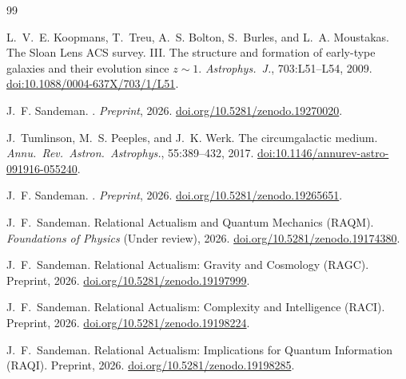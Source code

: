 \documentclass[11pt,a4paper]{article}
\theoremstyle{plain}
\theoremstyle{definition}
\theoremstyle{remark}
\begin{document}

\begin{thebibliography}{99}

L.~V.~E. Koopmans, T.~Treu, A.~S. Bolton, S.~Burles, and L.~A. Moustakas.
\newblock The Sloan Lens ACS survey. III. The structure and formation of
  early-type galaxies and their evolution since $z \sim 1$.
\newblock \textit{Astrophys.\ J.}, 703:L51--L54, 2009.
\newblock \href{https://doi.org/10.1088/0004-637X/703/1/L51}{doi:10.1088/0004-637X/703/1/L51}.


J.~F. Sandeman.
.
\newblock \textit{Preprint}, 2026.
\newblock \href{https://doi.org/10.5281/zenodo.19270020}{doi.org/10.5281/zenodo.19270020}.


J.~Tumlinson, M.~S. Peeples, and J.~K. Werk.
\newblock The circumgalactic medium.
\newblock \textit{Annu.\ Rev.\ Astron.\ Astrophys.}, 55:389--432, 2017.
\newblock \href{https://doi.org/10.1146/annurev-astro-091916-055240}{doi:10.1146/annurev-astro-091916-055240}.


J.~F. Sandeman.
.
\newblock \textit{Preprint}, 2026.
\newblock \href{https://doi.org/10.5281/zenodo.19265651}{doi.org/10.5281/zenodo.19265651}.


J.~F.~Sandeman.
\newblock Relational Actualism and Quantum Mechanics ({RAQM}).
\newblock \textit{Foundations of Physics} (Under review), 2026.
\newblock \href{https://doi.org/10.5281/zenodo.19174380}{doi.org/10.5281/zenodo.19174380}.

J.~F.~Sandeman.
\newblock Relational Actualism: Gravity and Cosmology ({RAGC}).
\newblock Preprint, 2026.
\newblock \href{https://doi.org/10.5281/zenodo.19197999}{doi.org/10.5281/zenodo.19197999}.

J.~F.~Sandeman.
\newblock Relational Actualism: Complexity and Intelligence ({RACI}).
\newblock Preprint, 2026.
\newblock \href{https://doi.org/10.5281/zenodo.19198224}{doi.org/10.5281/zenodo.19198224}.

J.~F.~Sandeman.
\newblock Relational Actualism: Implications for Quantum Information ({RAQI}).
\newblock Preprint, 2026.
\newblock \href{https://doi.org/10.5281/zenodo.19198285}{doi.org/10.5281/zenodo.19198285}.


\end{thebibliography}
\end{document}

